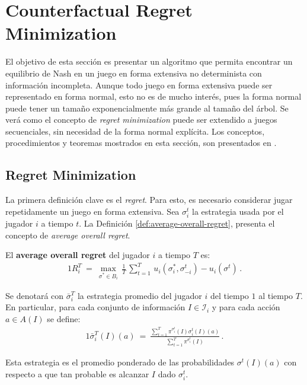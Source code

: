 \chapter{Counterfactual Regret Minimization}
\label{section:cfr}

El objetivo de esta sección es presentar un algoritmo que permita encontrar un equilibrio de Nash en un juego en forma extensiva no determinista con información incompleta. Aunque todo juego en forma extensiva puede ser representado en forma normal, esto no es de mucho interés, pues la forma normal puede tener un tamaño exponencialmente más grande al tamaño del árbol. Se verá como el concepto de \textit{regret minimization} puede ser extendido a juegos secuenciales, sin necesidad de la forma normal explícita. Los conceptos, procedimientos y teoremas mostrados en esta sección, son presentados en \cite{bib:cfr}.

\section{Regret Minimization}

La primera definición clave es el \textit{regret}. Para esto, es necesario considerar jugar repetidamente un juego en forma extensiva. Sea $\sigma_i^t$ la estrategia usada por el jugador $i$ a tiempo $t$. La Definición \ref{def:average-overall-regret}, presenta el concepto de \textit{average overall regret}.

\begin{definition}
\label{def:average-overall-regret}
El \textbf{average overall regret} del jugador $i$ a tiempo $T$ es:
\begin{alignat}{1}
R_i^T\ =\ \max_{\sigma^* \in B_i} \, \frac{1}{T}\, \sum_{t = 1}^T \, u_i(\sigma_i^*, \sigma_{-i}^t) - u_i(\sigma^t) \,.
\end{alignat}
\end{definition}

Se denotará con $\bar{\sigma}_i^{T}$ la estrategia promedio del jugador $i$ del tiempo $1$ al tiempo $T$. En particular, para cada conjunto de información $I \in \mathcal{I}_i$ y para cada acción $a \in A(I)$ se define:
\begin{alignat}{1}
\bar{\sigma}_i^{T}(I)(a)\ =\ \frac{\sum_{t = 1}^T \pi^{\sigma^t_i}(I)\sigma^t_i(I)(a)}{\sum_{t = 1}^T \pi^{\sigma_i^t}(I)} \,.
\end{alignat}

Esta estrategia es el promedio ponderado de las probabilidades $\sigma^t(I)(a)$ con respecto a que tan probable es alcanzar $I$ dado $\sigma_i^t$.

